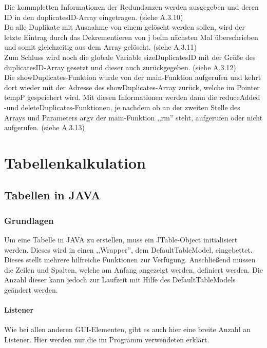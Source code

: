 \documentclass[12pt]{report}
\begin{document}
\noindent Die kommpletten Informationen der Redundanzen werden ausgegeben und deren ID in den duplicatesID-Array eingetragen. (siehe A.3.10)\\

\noindent Da alle Duplikate mit Ausnahme von einem gelöscht werden sollen, wird der letzte Eintrag durch das Dekrementieren von j beim nächsten Mal überschrieben und somit gleichzeitig aus dem Array gelöscht. (siehe A.3.11)\\

\noindent Zum Schluss wird noch die globale Variable sizeDuplicatesID mit der Größe des duplicatesID-Array gesetzt und dieser auch zurückgegeben. (siehe A.3.12)\\

\noindent Die showDuplicates-Funktion wurde von der main-Funktion aufgerufen und kehrt dort wieder mit der Adresse des showDuplicates-Array zurück, welche im Pointer tempP gespeichert wird. Mit diesen Informationen werden dann die reduceAdded -und deleteDuplicates-Funktionen, je nachdem ob an der zweiten Stelle des Arrays und Parameters argv der main-Funktion ,,rm'' steht, aufgerufen oder nicht aufgerufen. (siehe A.3.13)






\part{Tabellenkalkulation}

\chapter{Tabellen in JAVA}

\section{Grundlagen}
Um eine Tabelle in JAVA zu erstellen, muss ein JTable-Object initialisiert werden. Dieses wird in einen ,,Wrapper'', dem DefaultTableModel, eingebettet. Dieses stellt mehrere hilfreiche Funktionen zur Verfügung. Anschließend müssen die Zeilen und Spalten, welche am Anfang angezeigt werden, definiert werden. Die Anzahl dieser kann jedoch zur Laufzeit mit Hilfe des DefaultTableModels geändert werden.

\subsection{Listener}
Wie bei allen anderen GUI-Elementen, gibt es auch hier eine breite Anzahl an Listener. Hier werden nur die im Programm verwendeten erklärt.
\end{document}
